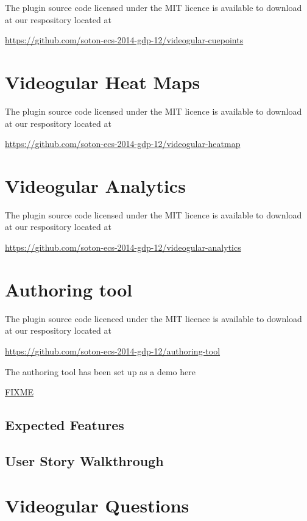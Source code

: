\documentclass[12pt,a4paper]{article}
\begin{document}
The plugin source code licensed under the MIT licence is available to download at our respository located at 

\url{https://github.com/soton-ecs-2014-gdp-12/videogular-cuepoints}

\section*{Videogular Heat Maps}

The plugin source code licensed under the MIT licence is available to download at our respository located at 

\url{https://github.com/soton-ecs-2014-gdp-12/videogular-heatmap}

\section*{Videogular Analytics}

The plugin source code licensed under the MIT licence is available to download at our respository located at 

\url{https://github.com/soton-ecs-2014-gdp-12/videogular-analytics}

\section*{Authoring tool}

The plugin source code licenced under the MIT licence is available to download at our respository located at 

\url{https://github.com/soton-ecs-2014-gdp-12/authoring-tool}

The authoring tool has been set up as a demo here

\url{FIXME}

\subsection*{Expected Features}



\subsection*{User Story Walkthrough}

\section*{Videogular Questions}
\end{document}
